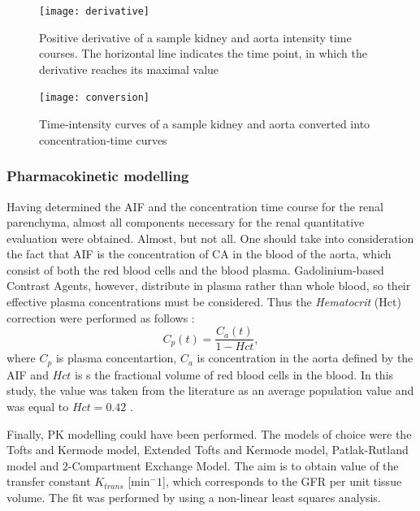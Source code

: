 \begin{figure}[H]
	\centering
	\texttt{[image: derivative]}
\caption[Positive derivative of the sample kidney and aorta intensity time courses]{Positive derivative of a sample kidney and aorta intensity time courses. The horizontal line indicates the time point, in which the derivative reaches its maximal value}
\label{fig:derivative}
\end{figure}

\begin{figure}[H]
	\centering
	\texttt{[image: conversion]}
\caption[Time courses of a sample kidney and aorta after intensity-concentration conversion]{Time-intensity curves of a sample kidney and aorta converted into concentration-time curves}
\label{fig:conversion}
\end{figure}


\subsubsection{Pharmacokinetic modelling}

Having determined the AIF and the concentration time course for the renal pa\-ren\-chy\-ma, almost all components necessary for the renal quantitative evaluation were obtained. Almost, but not all. One should take into consideration the fact that AIF is the concentration of CA in the blood of the aorta, which consist of both the red blood cells and the blood plasma. Gadolinium-based Contrast Agents, however, distribute in plasma rather than whole blood, so their effective plasma concentrations must be considered. Thus the \textit{Hematocrit} (Hct) correction were performed as follows \cite{tofts2010t1}:
\begin{equation}
	\label{eq:hematocrit}
	C_{p}(t) = \frac{C_{a}(t)} {1-Hct},
\end{equation}
where $C_p$ is plasma concentartion, $C_a$ is concentration in the aorta defined by the AIF and $Hct$ is s the fractional volume of red blood cells in the blood. In this study, the value was taken from the literature as an average population value and was equal to $Hct=0.42$ \cite{tofts2010t1}.

Finally, PK modelling could have been performed. The models of choice were the Tofts and Kermode model, Extended Tofts and Kermode model, Patlak-Rutland model and 2-Compartment Exchange Model. The aim is to obtain value of the transfer constant $K_{trans}$ [min$^-1$], which corresponds to the GFR per unit tissue volume. The fit was performed by using a non-linear least squares analysis.
 
